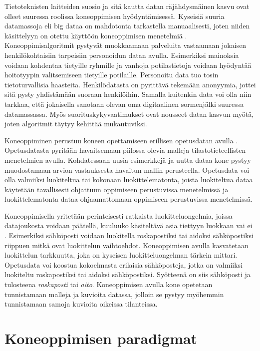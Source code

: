 \documentclass[utf8]{gradu3}
\begin{document}
Tietoteknisten laitteiden suosio ja sitä kautta datan räjähdysmäinen kasvu ovat olleet suuressa roolissa koneoppimisen hyödyntämisessä. Kyseisiä suuria datamassoja eli big dataa on mahdotonta tarkastella manuaalisesti, joten niiden käsittelyyn on otettu käyttöön koneoppimisen menetelmiä \parencite{jordan2015machine}. Koneoppimisalgoritmit pystyvät muokkaamaan palveluita vastaamaan jokaisen henkilökohtaisiin tarpeisiin personoidun datan avulla. Esimerkiksi mainoksia voidaan kohdentaa tietyille ryhmille ja vanhoja potilastietoja voidaan hyödyntää hoitotyypin valitsemiseen tietyille potilaille. Personoitu data tuo tosin tietoturvallisia haasteita. Henkilödatasta on pyrittävä tekemään anonyymia, jottei sitä pysty yhdistämään suoraan henkilöihin. Samalla kuitenkin data voi olla niin tarkkaa, että jokaisella sanotaan olevan oma digitaalinen sormenjälki suuressa datamassassa. Myös suorituskykyvaatimukset ovat nousseet datan kasvun myötä, joten algoritmit täytyy kehittää mukautuviksi.

Koneoppiminen perustuu koneen opettamiseen erillisen opetusdatan avulla \parencite{das2017survey,jordan2015machine}. Opetusdatasta pyritään havaitsemaan piilossa olevia malleja tilastotieteellisten menetelmien avulla. Kohdatessaan uusia esimerkkejä ja uutta dataa kone pystyy muodostamaan arvion vastauksesta havaitun mallin perusteella. Opetusdata voi olla valmiiksi luokiteltua tai kokonaan luokittelematonta, joista luokiteltua dataa käytetään tavallisesti ohjattuun oppimiseen perustuvissa menetelmissä ja luokittelematonta dataa ohjaamattomaan oppimiseen perustuvissa menetelmissä.

Koneoppimisella yritetään perinteisesti ratkaista luokitteluongelmia, joissa datajoukosta voidaan päätellä, kuuluuko käsiteltävä asia tiettyyn luokkaan vai ei \parencite{jordan2015machine}. Esimerkiksi sähköposti voidaan luokitella roskapostiksi tai aidoksi sähköpostiksi riippuen mitkä ovat luokittelun vaihtoehdot. Koneoppimisen avulla kasvatetaan luokittelun tarkkuutta, joka on kyseisen luokitteluongelman tärkein mittari. Opetusdata voi koostua kokoelmasta erilaisia sähköposteja, jotka on valmiiksi luokiteltu roskapostiksi tai aidoksi sähköpostiksi. Syötteenä on siis sähköposti ja tulosteena \textit{roskaposti} tai \textit{aito}. Koneoppimisen avulla kone opetetaan tunnistamaan malleja ja kuvioita datassa, jolloin se pystyy myöhemmin tunnistamaan samoja kuvioita oikeissa tilanteissa.

\section{Koneoppimisen paradigmat}
\end{document}
